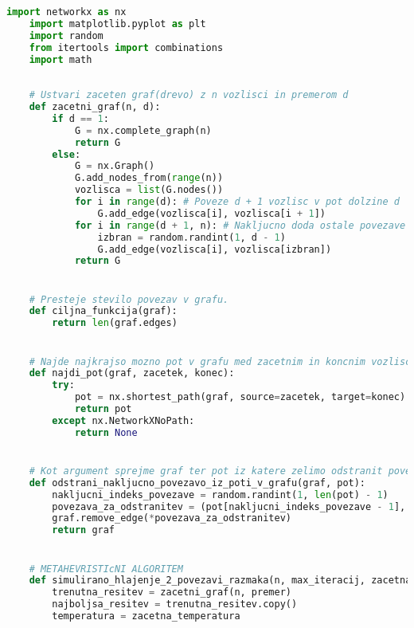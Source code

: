 \documentclass[12pt,a4paper]{amsart}
\theoremstyle{definition} %
\theoremstyle{plain} %
\begin{document}
\begin{lstlisting}[language=Python]
    import networkx as nx
    import matplotlib.pyplot as plt
    import random
    from itertools import combinations
    import math
    
    
    # Ustvari zaceten graf(drevo) z n vozlisci in premerom d
    def zacetni_graf(n, d):
        if d == 1:
            G = nx.complete_graph(n)
            return G
        else:
            G = nx.Graph()
            G.add_nodes_from(range(n))
            vozlisca = list(G.nodes())
            for i in range(d): # Poveze d + 1 vozlisc v pot dolzine d
                G.add_edge(vozlisca[i], vozlisca[i + 1])
            for i in range(d + 1, n): # Nakljucno doda ostale povezave na notranjih d - 1 vozlisc
                izbran = random.randint(1, d - 1)
                G.add_edge(vozlisca[i], vozlisca[izbran])
            return G


    # Presteje stevilo povezav v grafu.
    def ciljna_funkcija(graf):
        return len(graf.edges)


    # Najde najkrajso mozno pot v grafu med zacetnim in koncnim vozliscem.
    def najdi_pot(graf, zacetek, konec):
        try:
            pot = nx.shortest_path(graf, source=zacetek, target=konec)
            return pot
        except nx.NetworkXNoPath:
            return None


    # Kot argument sprejme graf ter pot iz katere zelimo odstranit povezavo, nato iz nje nakljucno odstrani povezavo.
    def odstrani_nakljucno_povezavo_iz_poti_v_grafu(graf, pot):
        nakljucni_indeks_povezave = random.randint(1, len(pot) - 1)
        povezava_za_odstranitev = (pot[nakljucni_indeks_povezave - 1], pot[nakljucni_indeks_povezave])
        graf.remove_edge(*povezava_za_odstranitev)
        return graf


    # METAHEVRISTIcNI ALGORITEM 
    def simulirano_hlajenje_2_povezavi_razmaka(n, max_iteracij, zacetna_temperatura, stopnja_hlajenja, premer):
        trenutna_resitev = zacetni_graf(n, premer)
        najboljsa_resitev = trenutna_resitev.copy()
        temperatura = zacetna_temperatura


\end{lstlisting}
\end{document}

